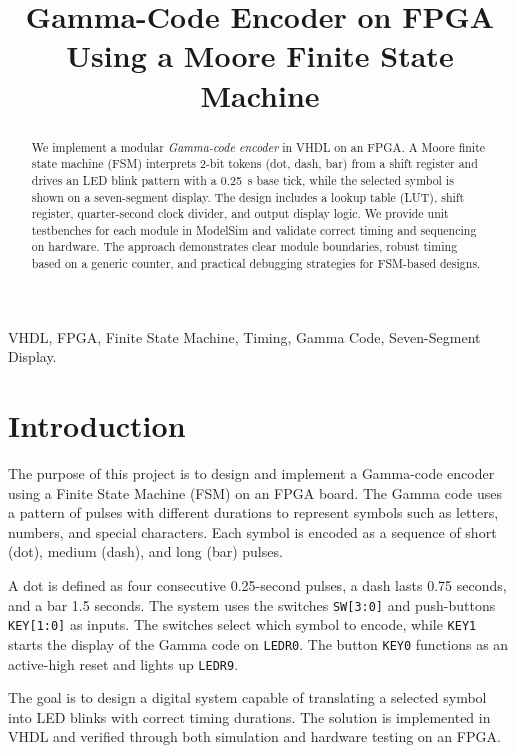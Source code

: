 \documentclass[conference]{IEEEtran}
\begin{document}
\title{Gamma-Code Encoder on FPGA Using a Moore Finite State Machine}

\author{
}

\maketitle

\begin{abstract}
We implement a modular \emph{Gamma-code encoder} in VHDL on an FPGA. A Moore finite state machine (FSM) interprets 2-bit tokens (dot, dash, bar) from a shift register and drives an LED blink pattern with a 0.25~s base tick, while the selected symbol is shown on a seven-segment display. The design includes a lookup table (LUT), shift register, quarter-second clock divider, and output display logic. We provide unit testbenches for each module in ModelSim and validate correct timing and sequencing on hardware. The approach demonstrates clear module boundaries, robust timing based on a generic counter, and practical debugging strategies for FSM-based designs.
\end{abstract}

\begin{IEEEkeywords}
VHDL, FPGA, Finite State Machine, Timing, Gamma Code, Seven-Segment Display.
\end{IEEEkeywords}

\section{Introduction}
The purpose of this project is to design and implement a Gamma-code encoder using a Finite State Machine (FSM) on an FPGA board. The Gamma code uses a pattern of pulses with different durations to represent symbols such as letters, numbers, and special characters. Each symbol is encoded as a sequence of short (dot), medium (dash), and long (bar) pulses.

A dot is defined as four consecutive 0.25-second pulses, a dash lasts 0.75 seconds, and a bar 1.5 seconds. The system uses the switches \texttt{SW[3:0]} and push-buttons \texttt{KEY[1:0]} as inputs. The switches select which symbol to encode, while \texttt{KEY1} starts the display of the Gamma code on \texttt{LEDR0}. The button \texttt{KEY0} functions as an active-high reset and lights up \texttt{LEDR9}.

The goal is to design a digital system capable of translating a selected symbol into LED blinks with correct timing durations. The solution is implemented in VHDL and verified through both simulation and hardware testing on an FPGA.
\end{document}
